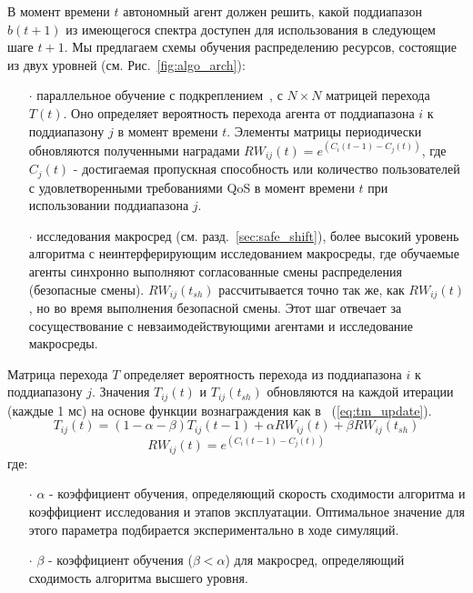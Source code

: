 В момент времени $t$ автономный агент должен решить, какой поддиапазон $b(t+1)$ из имеющегося спектра доступен для использования в следующем шаге $t+1$. Мы предлагаем схемы обучения распределению ресурсов, состоящие из двух уровней (см. Рис.~\ref{fig:algo_arch}):

\begin{itemize}
\item[$\cdot$] параллельное обучение с подкреплением~\cite{4445757}, с $N\times N$ матрицей перехода $T(t)$. Оно определяет вероятность перехода агента от поддиапазона $i$ к поддиапазону $j$ в момент времени $t$. Элементы матрицы периодически обновляются полученными наградами $RW_{ij}(t) = e^{(C_i(t-1) - C_j(t))}$, где $C_j(t)$ - достигаемая пропускная способность или количество пользователей с удовлетворенными требованиями QoS в момент времени $t$ при использовании поддиапазона $j$.
\item[$\cdot$] исследования макросред (см. разд.~\ref{sec:safe_shift}), более высокий уровень алгоритма с неинтерферирующим исследованием макросреды, где обучаемые агенты синхронно выполняют согласованные смены распределения (безопасные смены). $RW_{ij}(t_{sh})$ рассчитывается точно так же, как $RW_{ij}(t)$, но во время выполнения безопасной смены. Этот шаг отвечает за сосуществование с невзаимодействующими агентами и исследование макросреды.
\end{itemize}

Матрица перехода $T$ определяет вероятность перехода из поддиапазона $i$ к поддиапазону $j$. Значения $T_{ij}(t)$ и $T_{ij}(t_{sh})$ обновляются на каждой итерации (каждые 1 мс) на основе функции вознаграждения как в ~(\ref{eq:tm_update}).
\begin{equation}
    \label{eq:tm_update}
    T_{ij}(t) = (1-\alpha-\beta)T_{ij}(t-1) + \alpha RW_{ij}(t) + \beta RW_{ij}(t_{sh})
\end{equation}
\begin{equation}
    \label{eq:tm_update_c}
    RW_{ij}(t) = e^{(C_i(t-1) - C_j(t))}
\end{equation}
где:

\begin{itemize}
\item[$\cdot$]$ \alpha$ - коэффициент обучения, определяющий скорость сходимости алгоритма и коэффициент исследования и этапов эксплуатации. Оптимальное значение для этого параметра подбирается экспериментально в ходе симуляций.
\item[$\cdot$] $\beta$ - коэффициент обучения ($\beta < \alpha$) для макросред, определяющий сходимость алгоритма высшего уровня.
\end{itemize} 


